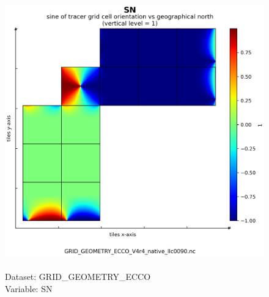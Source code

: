 \begin{figure}[H]
\centering
\includegraphics[scale=0.5]{../images/plots/native_plots_coords/Geometry_Parameters_for_the_Lat-Lon-Cap_90_(llc90)_Native_Model_Grid_(Version_4_Release_4)/SN.png}
\caption{\\Dataset: GRID\_GEOMETRY\_ECCO\\Variable: SN}
\label{tab:table-GRID_GEOMETRY_ECCO_SN-Plot}
\end{figure}
\pagebreak
